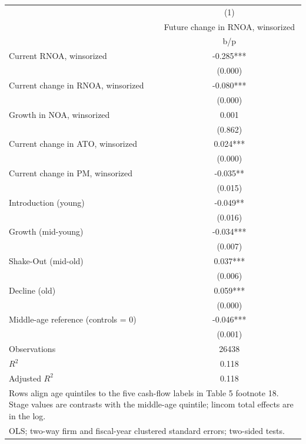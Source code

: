 {
\def\sym#1{\ifmmode^{#1}\else\(^{#1}\)\fi}
\begin{tabular}{l*{1}{c}}
\hline\hline
                    &\multicolumn{1}{c}{(1)}\\
                    &\multicolumn{1}{c}{Future change in RNOA, winsorized}\\
                    &         b/p   \\
\hline
Current RNOA, winsorized&      -0.285***\\
                    &     (0.000)   \\
Current change in RNOA, winsorized&      -0.080***\\
                    &     (0.000)   \\
Growth in NOA, winsorized&       0.001   \\
                    &     (0.862)   \\
Current change in ATO, winsorized&       0.024***\\
                    &     (0.000)   \\
Current change in PM, winsorized&      -0.035** \\
                    &     (0.015)   \\
Introduction (young)&      -0.049** \\
                    &     (0.016)   \\
Growth (mid-young)  &      -0.034***\\
                    &     (0.007)   \\
Shake-Out (mid-old) &       0.037***\\
                    &     (0.006)   \\
Decline (old)       &       0.059***\\
                    &     (0.000)   \\
Middle-age reference (controls = 0)&      -0.046***\\
                    &     (0.001)   \\
\hline
Observations        &       26438   \\
\(R^{2}\)           &       0.118   \\
Adjusted \(R^{2}\)  &       0.118   \\
\hline\hline
\multicolumn{2}{l}{\footnotesize Rows align age quintiles to the five cash-flow labels in Table 5 footnote 18. Stage values are contrasts with the middle-age quintile; lincom total effects are in the log.}\\
\multicolumn{2}{l}{\footnotesize OLS; two-way firm and fiscal-year clustered standard errors; two-sided tests.}\\
\end{tabular}
}
